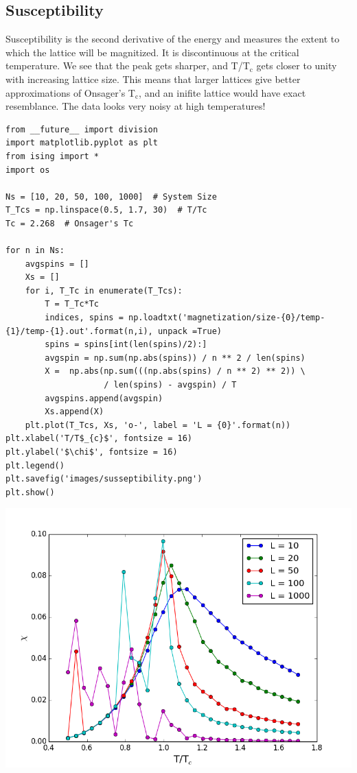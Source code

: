 \documentclass{article}
\begin{document}
\subsection{Susceptibility}
\label{sec-5-3}

Susceptibility is the second derivative of the energy and measures the extent to which the lattice will be magnitized. It is discontinuous at the critical temperature. We see that the peak gets sharper, and T/T$_{\text{c}}$ gets closer to unity with increasing lattice size. This means that larger lattices give better approximations of Onsager's T$_{\text{c}}$, and an inifite lattice would have exact resemblance. The data looks very noisy at high temperatures!

\begin{verbatim}
from __future__ import division
import matplotlib.pyplot as plt
from ising import *
import os

Ns = [10, 20, 50, 100, 1000]  # System Size
T_Tcs = np.linspace(0.5, 1.7, 30)  # T/Tc
Tc = 2.268  # Onsager's Tc

for n in Ns:
    avgspins = []
    Xs = []
    for i, T_Tc in enumerate(T_Tcs):
        T = T_Tc*Tc
        indices, spins = np.loadtxt('magnetization/size-{0}/temp-{1}/temp-{1}.out'.format(n,i), unpack =True)
        spins = spins[int(len(spins)/2):]
        avgspin = np.sum(np.abs(spins)) / n ** 2 / len(spins)
        X =  np.abs(np.sum(((np.abs(spins) / n ** 2) ** 2)) \
                    / len(spins) - avgspin) / T
        avgspins.append(avgspin)
        Xs.append(X)
    plt.plot(T_Tcs, Xs, 'o-', label = 'L = {0}'.format(n))
plt.xlabel('T/T$_{c}$', fontsize = 16)
plt.ylabel('$\chi$', fontsize = 16)
plt.legend()
plt.savefig('images/susseptibility.png')
plt.show()
\end{verbatim}

\includegraphics[width=.9\linewidth]{./images/susseptibility.png}
\end{document}
